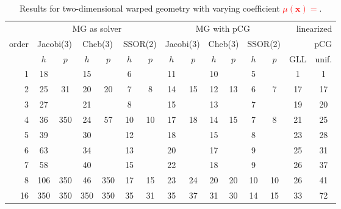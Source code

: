 \documentclass[smallcondensed,final]{svjour3}     %
\newcommand{\todo}[1]{\textcolor{red}{\bf #1}}
\newcommand{\bs}[1]{\ensuremath{\boldsymbol #1}}
\begin{document}
\begin{table}
  \caption{\label{tab:2d-fan} Results for two-dimensional warped geometry
    with varying coefficient \todo{$\mu(\bs x) =$}.}
  \centering
  \begin{tabular}{|r|c c|c c|c c||c c|c c|c c||c c|} 
    \hline
    & \multicolumn{6}{c||}{MG as solver} & \multicolumn{6}{c||}{MG with pCG} & \multicolumn{2}{r|}{linearized} \\
    \cline{2-13}
    \!\!\! order \!\!\!\! &  \multicolumn{2}{c|}{\!\scriptsize  Jacobi(3)\!} &  \multicolumn{2}{c|}{\!\scriptsize Cheb(3)\!} & \multicolumn{2}{c||}{\!\scriptsize  SSOR(2)\!} & \multicolumn{2}{c|}{\!\scriptsize Jacobi(3)\!} &  \multicolumn{2}{c|}{\!\scriptsize Cheb(3)\!} & \multicolumn{2}{c||}{\!\scriptsize SSOR(2)\!} & \multicolumn{2}{r|}{pCG}\\
\hline
 & $h$ & $p$ & $h$ & $p$& $h$ & $p$& $h$ & $p$& $h$ & $p$& $h$ & $p$& GLL & unif.\\
 \cline{2-15}
1 & 18 & & 15 & & 6 & & 11 & & 10 & & 5 & & 1 & 1  \\
2 & 25 & 31 & 20 & 20 & 7 & 8 & 14 & 15 & 12 & 13 & 6 & 7 & 17 & 17 \\
3 & 27 & & 21 & & 8 & & 15 & & 13 & & 7 & & 19 & 20  \\
4 & 36 & 350 & 24 & 57 & 10 & 10 & 17 & 18 & 14 & 15 & 7 & 8 & 21 & 25 \\
5 & 39 & & 30 & & 12 & & 18 & & 15 & & 8 & & 23 & 28  \\
6 & 63 & & 34 & & 13 & & 20 & & 17 & & 9 & & 25 & 31  \\
7 & 58 & & 40 & & 15 & & 22 & & 18 & & 9 & & 26 & 37  \\
8 & 106 & 350 & 46 & 350 & 17 & 15 & 23 & 24 & 20 & 20 & 10 & 10 & 26 & 41 \\
16 & 350 & 350 & 350 & 350 & 35 & 31 & 35 & 37 & 31 & 30 & 14 & 15 & 33 & 72 \\
\hline
  \end{tabular}
\end{table}
\end{document}
